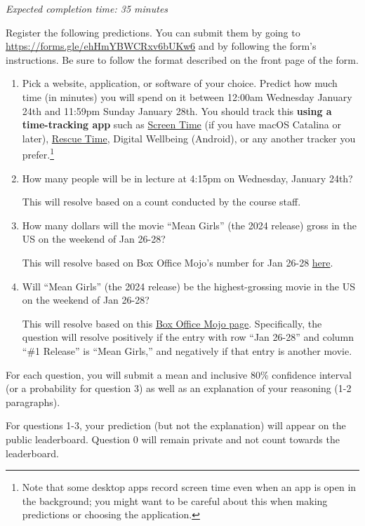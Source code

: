 \documentclass[11pt]{article}
\begin{document}
\emph{Expected completion time: 35 minutes}


Register the following predictions. You can submit them by going to 
\url{https://forms.gle/ehHmYBWCRxv6bUKw6} and by following the form's instructions. Be sure to follow the format described on the front page of the form.

\begin{enumerate}
\item[0.] Pick a website, application, or software of your choice. Predict how much time (in minutes) you will spend on it between 12:00am Wednesday January 24th and 11:59pm Sunday January 28th. You should track this {\bf using a time-tracking app} such as \href{https://support.apple.com/en-us/HT210387}{Screen Time} (if you have macOS Catalina or later), \href{https://www.rescuetime.com/}{Rescue Time}, Digital Wellbeing (Android), or any another tracker you prefer.\footnote{Note that some desktop apps record screen time even when an app is open in the background; you might want to be careful about this when making predictions or choosing the application.}

\item[1.] How many people will be in lecture at 4:15pm on Wednesday, January 24th?

      This will resolve based on a count conducted by the course staff.

\item[2.] How many dollars will the movie ``Mean Girls'' (the 2024 release) gross in the US on the weekend of Jan 26-28?

      This will resolve based on Box Office Mojo's number for Jan 26-28 \href{https://www.boxofficemojo.com/release/rl615482113/weekend/?ref_=bo_rl_tab#tabs}{here}. 

\item[3.] Will ``Mean Girls'' (the 2024 release) be the highest-grossing movie in the US on the weekend of Jan 26-28? 

      This will resolve based on this \href{https://www.boxofficemojo.com/weekend/?ref_=bo_nb_wey_secondarytab}{Box Office Mojo page}. Specifically, the question will resolve positively if the entry with row ``Jan 26-28'' and column ``\#1 Release'' is ``Mean Girls,'' and negatively if that entry is another movie.

\end{enumerate}
 
For each question, you will submit a mean and inclusive 80\% confidence interval (or a probability for question 3) 
as well as an explanation of your reasoning (1-2 paragraphs).

For questions 1-3, your prediction (but not the explanation) will appear on the public leaderboard. 
Question 0 will remain private and not count towards the leaderboard.
\end{document}
